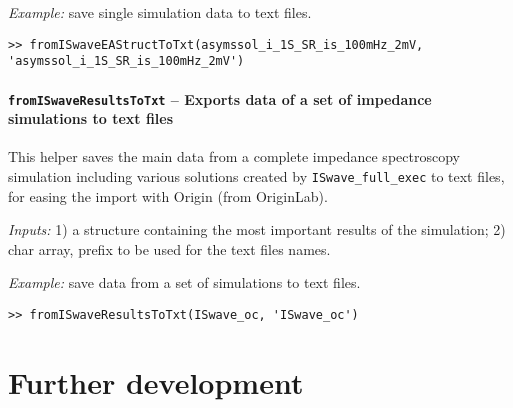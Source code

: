 \textit{Example:} save single simulation data to text files.
\begin{lstlisting}[style=Matlab-editor]
>> fromISwaveEAStructToTxt(asymssol_i_1S_SR_is_100mHz_2mV, 'asymssol_i_1S_SR_is_100mHz_2mV')
\end{lstlisting}

\paragraph{\texttt{from\-ISwave\-Results\-ToTxt} -- Exports data of a set of impedance simulations to text files}
This helper saves the main data from a complete impedance spectroscopy simulation including various solutions created by \texttt{ISwave\_full\_exec} to text files, for easing the import with Origin (from OriginLab).

\textit{Inputs:} 1) a structure containing the most important results of the simulation;
2) char array, prefix to be used for the text files names.




\textit{Example:} save data from a set of simulations to text files.
\begin{lstlisting}[style=Matlab-editor]
>> fromISwaveResultsToTxt(ISwave_oc, 'ISwave_oc')
\end{lstlisting}


\section{Further development}


